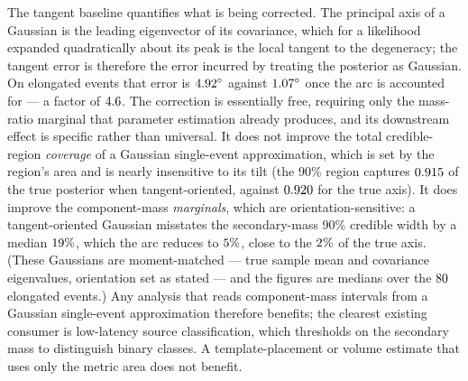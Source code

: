 \documentclass[aps,prd,twocolumn,amsmath,amssymb,nofootinbib,superscriptaddress]{revtex4-2}
\begin{document}
The tangent baseline quantifies what is being corrected. The principal axis of a Gaussian is the leading
eigenvector of its covariance, which for a likelihood expanded quadratically about its peak is the local
tangent to the degeneracy; the tangent error is therefore the error incurred by treating the posterior as
Gaussian. On elongated events that error is $4.92^\circ$ against $1.07^\circ$ once
the arc is accounted for --- a factor of $4.6$. The correction is essentially free, requiring only
the mass-ratio marginal that parameter estimation already produces, and its downstream effect is specific
rather than universal. It does not improve the total credible-region \emph{coverage} of a Gaussian
single-event approximation, which is set by the region's area and is nearly insensitive to its tilt (the
$90\%$ region captures $0.915$ of the true posterior when tangent-oriented, against
$0.920$ for the true axis). It does improve the component-mass \emph{marginals}, which are
orientation-sensitive: a tangent-oriented Gaussian misstates the secondary-mass $90\%$ credible width by a
median $19\%$, which the arc reduces to $5\%$, close to the $2\%$ of the true
axis. (These Gaussians are moment-matched --- true sample mean and covariance eigenvalues, orientation
set as stated --- and the figures are medians over the $80$ elongated events.) Any analysis
that reads component-mass intervals from a Gaussian single-event approximation therefore benefits; the
clearest existing consumer is low-latency source classification, which thresholds on the secondary mass
to distinguish binary classes. A template-placement or volume estimate that uses only the metric area
does not benefit.
\end{document}
